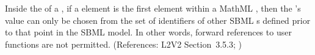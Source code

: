 Inside the  of a \FunctionDefinition, if a
 element is the first element within a MathML
, then the 's value can only be chosen from
the set of identifiers of other SBML \FunctionDefinition{}s
defined prior to that point in the SBML model.  In other words,
forward references to user functions are not permitted.
(References: L2V2 Section~3.5.3; )
